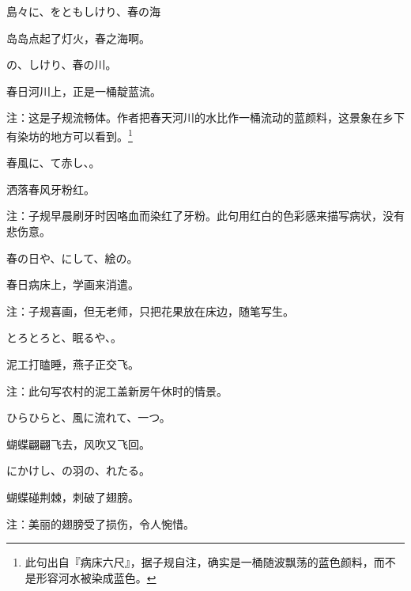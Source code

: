 \begin{haiku}
    {\FH 島々に、をともしけり、春の海}

    {\FK 岛岛点起了灯火，春之海啊。}
\end{haiku}

\begin{haiku}
    {\FH {}の、しけり、春の川。}

    {\FK 春日河川上，正是一桶靛蓝流。}

    {\FT 注：这是子规流畅体。作者把春天河川的水比作一桶流动的蓝颜料，这景象在乡下有染坊的地方可以看到。\footnote{\FT 此句出自『病床六尺』，据子规自注，确实是一桶随波飘荡的蓝色颜料，而不是形容河水被染成蓝色。}}
\end{haiku}

\begin{haiku}
    {\FH 春風に、て赤し、。}

    {\FK 洒落春风牙粉红。}

    {\FT 注：子规早晨刷牙时因咯血而染红了牙粉。此句用红白的色彩感来描写病状，没有悲伤意。}
\end{haiku}

\begin{haiku}
    {\FH 春の日や、にして、絵の。}

    {\FK 春日病床上，学画来消遣。}

    {\FT 注：子规喜画，但无老师，只把花果放在床边，随笔写生。}
\end{haiku}

\begin{haiku}
    {\FH とろとろと、眠るや、。}

    {\FK 泥工打瞌睡，燕子正交飞。}

    {\FT 注：此句写农村的泥工盖新房午休时的情景。}
\end{haiku}

\begin{haiku}
    {\FH ひらひらと、風に流れて、一つ。}

    {\FK 蝴蝶翩翩飞去，风吹又飞回。}
\end{haiku}

\begin{haiku}
    {\FH {}にかけし、の羽の、れたる。}

    {\FK 蝴蝶碰荆棘，刺破了翅膀。}

    {\FT 注：美丽的翅膀受了损伤，令人惋惜。}
\end{haiku}

